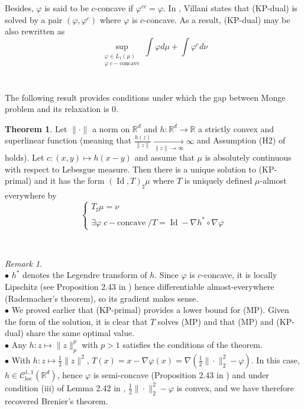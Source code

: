 \documentclass{article}
\theoremstyle{definition}
\newtheorem{thm}{Theorem}[section]
\theoremstyle{remark}
\newtheorem{rem}{Remark}
\DeclareMathOperator{\id}{Id}
\begin{document}
Besides, $\varphi$ is said to be $c$-concave if $\varphi^{cc}=\varphi$. In \cite{villani2003topics}, Villani states that (KP-dual) is solved by a pair $(\varphi, \varphi^c)$ where $\varphi$ is $c$-concave. As a result, (KP-dual) may be also rewritten as 
\begin{equation}\tag{KP-dual 4}
\sup_{\substack{\varphi \in L_1(\mu)\\ \varphi\; c-\text{concave}}} \int \varphi d\mu + \int \varphi^c d\nu
\end{equation}
\\
\\
The following result provides conditions under which the gap between Monge problem and its relaxation is $0$.
\begin{thm}
Let $\|\cdot\|$ a norm on $\mathbb R^d$ and $h:\mathbb R^d\to \mathbb R$ a strictly convex and superlinear function (meaning that $\frac{h(z)}{\|z\|}\xrightarrow[\|z\|\to \infty]{} \infty$ and Assumption (H2) of \cite{gangbo1996geometry} holds). Let $c:(x,y)\mapsto h(x-y)$ and assume that $\mu$ is absolutely continuous with respect to Lebesgue measure.
Then there is a unique solution to (KP-primal) and it has the form $(\id,T)_\sharp \mu$ where $T$ is uniquely defined $\mu$-almost everywhere by 
$$\begin{cases}
T_\sharp \mu = \nu\\
\exists \varphi \;c-\text{concave} \;/ T = \id - \nabla h^* \circ \nabla \varphi
\end{cases}$$
\end{thm}
\hfill
\\
\begin{rem}\hfill\\
$\bullet$ $h^*$ denotes the Legendre transform of $h$. Since $\varphi$ is $c$-concave, it is locally Lipschitz (see Proposition 2.43 in \cite{villani2003topics}) hence differentiable almost-everywhere (Rademacher's theorem), so its gradient makes sense.\\
$\bullet$ We proved earlier that (KP-primal) provides a lower bound for (MP). Given the form of the solution, it is clear that $T$ solves (MP) and that (MP) and (KP-dual) share the same optimal value.\\
$\bullet$ Any $h:z\mapsto \|z\|_p^p$ with $p>1$ satisfies the conditions of the theorem.\\
$\bullet$ With $h:z\mapsto \frac 12 \|z\|^2$, $T(x) = x - \nabla \varphi(x)=\nabla(\frac 12 \|\cdot\|_2^2 - \varphi)$. In this case, $h\in \mathcal C_{\text{loc}}^{1,1}(\mathbb R^d)$, hence $\varphi$ is semi-concave (Proposition 2.43 in \cite{villani2003topics}) and under condition (iii) of Lemma 2.42 in \cite{villani2003topics}, $\frac 12 \|\cdot\|_2^2 - \varphi$ is convex, and we have therefore recovered Brenier's theorem.
\end{rem}
\end{document}

